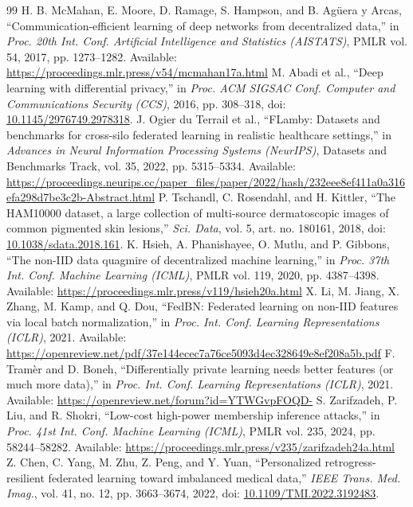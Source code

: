 \documentclass[10pt,twocolumn,a4paper]{article}
\begin{document}
{\small
\begin{thebibliography}{99}
\setlength{\itemsep}{1pt}
 H. B. McMahan, E. Moore, D. Ramage, S. Hampson, and B. Agüera y Arcas, ``Communication-efficient learning of deep networks from decentralized data,'' in \textit{Proc. 20th Int. Conf. Artificial Intelligence and Statistics (AISTATS)}, PMLR vol. 54, 2017, pp. 1273--1282. Available: \url{https://proceedings.mlr.press/v54/mcmahan17a.html}
 M. Abadi et al., ``Deep learning with differential privacy,'' in \textit{Proc. ACM SIGSAC Conf. Computer and Communications Security (CCS)}, 2016, pp. 308--318, doi: \href{https://doi.org/10.1145/2976749.2978318}{10.1145/2976749.2978318}.
 J. Ogier du Terrail et al., ``FLamby: Datasets and benchmarks for cross-silo federated learning in realistic healthcare settings,'' in \textit{Advances in Neural Information Processing Systems (NeurIPS)}, Datasets and Benchmarks Track, vol. 35, 2022, pp. 5315--5334. Available: \url{https://proceedings.neurips.cc/paper_files/paper/2022/hash/232eee8ef411a0a316efa298d7be3c2b-Abstract.html}
 P. Tschandl, C. Rosendahl, and H. Kittler, ``The HAM10000 dataset, a large collection of multi-source dermatoscopic images of common pigmented skin lesions,'' \textit{Sci. Data}, vol. 5, art. no. 180161, 2018, doi: \href{https://doi.org/10.1038/sdata.2018.161}{10.1038/sdata.2018.161}.
 K. Hsieh, A. Phanishayee, O. Mutlu, and P. Gibbons, ``The non-IID data quagmire of decentralized machine learning,'' in \textit{Proc. 37th Int. Conf. Machine Learning (ICML)}, PMLR vol. 119, 2020, pp. 4387--4398. Available: \url{https://proceedings.mlr.press/v119/hsieh20a.html}
 X. Li, M. Jiang, X. Zhang, M. Kamp, and Q. Dou, ``FedBN: Federated learning on non-IID features via local batch normalization,'' in \textit{Proc. Int. Conf. Learning Representations (ICLR)}, 2021. Available: \url{https://openreview.net/pdf/37e144ecec7a76ce5093d4ec328649e8ef208a5b.pdf}
 F. Tramèr and D. Boneh, ``Differentially private learning needs better features (or much more data),'' in \textit{Proc. Int. Conf. Learning Representations (ICLR)}, 2021. Available: \url{https://openreview.net/forum?id=YTWGvpFOQD-}
 S. Zarifzadeh, P. Liu, and R. Shokri, ``Low-cost high-power membership inference attacks,'' in \textit{Proc. 41st Int. Conf. Machine Learning (ICML)}, PMLR vol. 235, 2024, pp. 58244--58282. Available: \url{https://proceedings.mlr.press/v235/zarifzadeh24a.html}
 Z. Chen, C. Yang, M. Zhu, Z. Peng, and Y. Yuan, ``Personalized retrogress-resilient federated learning toward imbalanced medical data,'' \textit{IEEE Trans. Med. Imag.}, vol. 41, no. 12, pp. 3663--3674, 2022, doi: \href{https://doi.org/10.1109/TMI.2022.3192483}{10.1109/TMI.2022.3192483}.

\end{thebibliography}}
\end{document}
